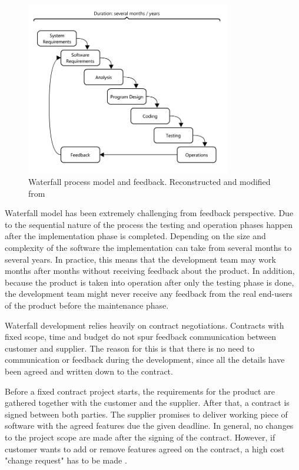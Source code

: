 \documentclass[english,12pt,a4paper,pdftex]{article}
\begin{document}
\begin{figure}[htb]
\begin{center}
\includegraphics[width=0.8\textwidth]{waterfall_reconstructed.png}
\end{center}
\caption{Waterfall process model and feedback. Reconstructed and modified from \citet{royce1970}}
\label{fig:waterfall}
\end{figure}


Waterfall model has been extremely challenging from feedback perspective. Due to the sequential nature of the process the testing and operation phases happen after the implementation phase is completed. Depending on the size and complexity of the software the implementation can take from several months to several years. In practice, this means that the development team may work months after months without receiving feedback about the product. In addition, because the product is taken into operation after only the testing phase is done, the development team might never receive any feedback from the real end-users of the product before the maintenance phase.

Waterfall development relies heavily on contract negotiations. Contracts with fixed scope, time and budget do not spur feedback communication between customer and supplier. The reason for this is that there is no need to communication or feedback during the development, since all the details have been agreed and written down to the contract. 

Before a fixed contract project starts, the requirements for the product are gathered together with the customer and the supplier. After that, a contract is signed between both parties. The supplier promises to deliver working piece of software with the agreed features due the given deadline. In general, no changes to the project scope are made after the signing of the contract. However, if customer wants to add or remove features agreed on the contract, a high cost "change request" has to be made \citep{beck2004}. 
\end{document}
